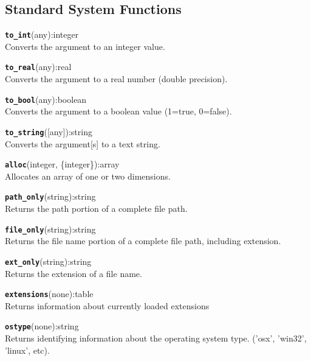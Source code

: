 \subsection{Standard System Functions}
\texttt{{\large\textbf{to\_int}}}\textsf{(any):integer}\\
 Converts the argument to an integer value.

\hrulefill

\texttt{{\large\textbf{to\_real}}}\textsf{(any):real}\\
 Converts the argument to a real number (double precision).

\hrulefill

\texttt{{\large\textbf{to\_bool}}}\textsf{(any):boolean}\\
 Converts the argument to a boolean value (1=true, 0=false).

\hrulefill

\texttt{{\large\textbf{to\_string}}}\textsf{([any]):string}\\
 Converts the argument[s] to a text string.

\hrulefill

\texttt{{\large\textbf{alloc}}}\textsf{(integer, \{integer\}):array}\\
 Allocates an array of one or two dimensions.

\hrulefill

\texttt{{\large\textbf{path\_only}}}\textsf{(string):string}\\
 Returns the path portion of a complete file path.

\hrulefill

\texttt{{\large\textbf{file\_only}}}\textsf{(string):string}\\
 Returns the file name portion of a complete file path, including extension.

\hrulefill

\texttt{{\large\textbf{ext\_only}}}\textsf{(string):string}\\
 Returns the extension of a file name.

\hrulefill

\texttt{{\large\textbf{extensions}}}\textsf{(none):table}\\
 Returns information about currently loaded extensions

\hrulefill

\texttt{{\large\textbf{ostype}}}\textsf{(none):string}\\
 Returns identifying information about the operating system type. ('osx', 'win32', 'linux', etc).

